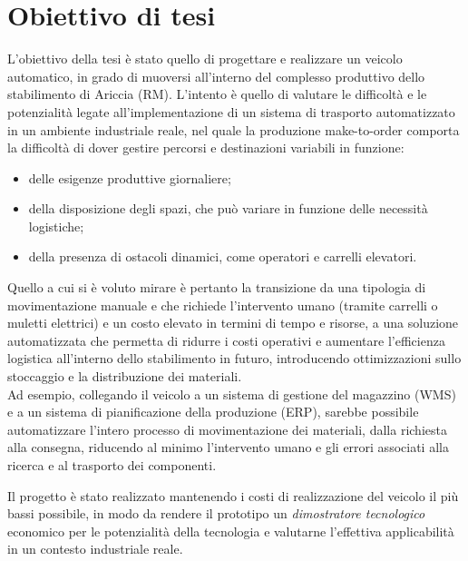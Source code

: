 \section{Obiettivo di tesi}
L'obiettivo della tesi è stato quello di progettare e realizzare un veicolo automatico, in grado di muoversi all'interno del complesso produttivo dello stabilimento di Ariccia (RM). L'intento è quello di valutare le difficoltà e le potenzialità legate all'implementazione di un sistema di trasporto automatizzato in un ambiente industriale reale, nel quale la produzione make-to-order comporta la difficoltà di dover gestire percorsi e destinazioni variabili in funzione:
\begin{itemize}
    \item delle esigenze produttive giornaliere;
    \item della disposizione degli spazi, che può variare in funzione delle necessità logistiche;
    \item della presenza di ostacoli dinamici, come operatori e carrelli elevatori.
\end{itemize}
Quello a cui si è voluto mirare è pertanto la transizione da una tipologia di movimentazione manuale e che richiede l'intervento umano (tramite carrelli o muletti elettrici) e un costo elevato in termini di tempo e risorse, a una soluzione automatizzata che permetta di ridurre i costi operativi e aumentare l'efficienza logistica all'interno dello stabilimento in futuro, introducendo ottimizzazioni sullo stoccaggio e la distribuzione dei materiali.\\
Ad esempio, collegando il veicolo a un sistema di gestione del magazzino (WMS) e a un sistema di pianificazione della produzione (ERP), sarebbe possibile automatizzare l'intero processo di movimentazione dei materiali, dalla richiesta alla consegna, riducendo al minimo l'intervento umano e gli errori associati alla ricerca e al trasporto dei componenti.

\begin{note}
    Il progetto è stato realizzato mantenendo i costi di realizzazione del veicolo il più bassi possibile, in modo da rendere il prototipo un \textit{dimostratore tecnologico} economico per le potenzialità della tecnologia e valutarne l'effettiva applicabilità in un contesto industriale reale.
\end{note}


